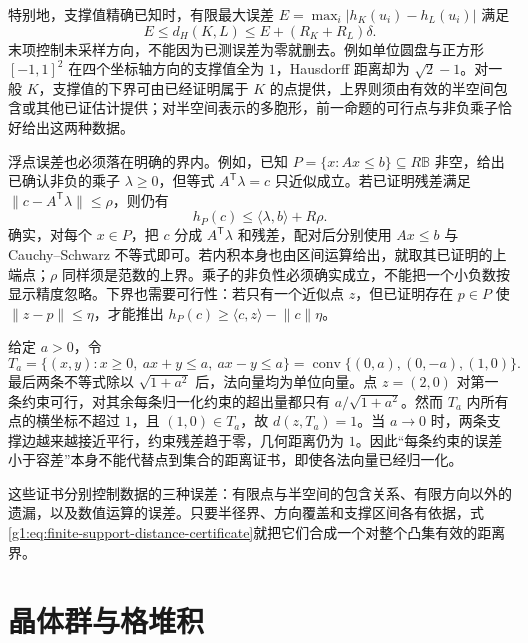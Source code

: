 特别地，支撑值精确已知时，有限最大误差 \(E=\max_i|h_K(u_i)-h_L(u_i)|\) 满足
\[
	E\le d_H(K,L)\le E+(R_K+R_L)\delta.
\]
末项控制未采样方向，不能因为已测误差为零就删去。例如单位圆盘与正方形 \([-1,1]^2\) 在四个坐标轴方向的支撑值全为 \(1\)，Hausdorff 距离却为 \(\sqrt2-1\)。对一般 \(K\)，支撑值的下界可由已经证明属于 \(K\) 的点提供，上界则须由有效的半空间包含或其他已证估计提供；对半空间表示的多胞形，前一命题的可行点与非负乘子恰好给出这两种数据。

\ProseParagraphBreak

浮点误差也必须落在明确的界内。例如，已知 \(P=\{x:Ax\le b\}\subseteq R\mathbb B\) 非空，给出已确认非负的乘子 \(\lambda\ge0\)，但等式 \(A^{\mathsf T}\lambda=c\) 只近似成立。若已证明残差满足 \(\lVert c-A^{\mathsf T}\lambda\rVert\le\rho\)，则仍有
\begin{equation}\label{g1:eq:dual-residual-support-bound}
	h_P(c)\le\langle\lambda,b\rangle+R\rho.
\end{equation}
确实，对每个 \(x\in P\)，把 \(c\) 分成 \(A^{\mathsf T}\lambda\) 和残差，配对后分别使用 \(Ax\le b\) 与 Cauchy--Schwarz 不等式即可。若内积本身也由区间运算给出，就取其已证明的上端点；\(\rho\) 同样须是范数的上界。乘子的非负性必须确实成立，不能把一个小负数按显示精度忽略。下界也需要可行性：若只有一个近似点 \(z\)，但已证明存在 \(p\in P\) 使 \(\lVert z-p\rVert\le\eta\)，才能推出 \(h_P(c)\ge\langle c,z\rangle-\lVert c\rVert\eta\)。

\begin{example}\label{g1:exm:small-residual-large-distance}
	给定 \(a>0\)，令
	\[
		T_a=\{(x,y):x\ge0,\ ax+y\le a,\ ax-y\le a\}
		=\operatorname{conv}\{(0,a),(0,-a),(1,0)\}.
	\]
	最后两条不等式除以 \(\sqrt{1+a^2}\) 后，法向量均为单位向量。点 \(z=(2,0)\) 对第一条约束可行，对其余每条归一化约束的超出量都只有 \(a/\sqrt{1+a^2}\)。然而 \(T_a\) 内所有点的横坐标不超过 \(1\)，且 \((1,0)\in T_a\)，故 \(d(z,T_a)=1\)。当 \(a\to0\) 时，两条支撑边越来越接近平行，约束残差趋于零，几何距离仍为 \(1\)。因此“每条约束的误差小于容差”本身不能代替点到集合的距离证书，即使各法向量已经归一化。
\end{example}

这些证书分别控制数据的三种误差：有限点与半空间的包含关系、有限方向以外的遗漏，以及数值运算的误差。只要半径界、方向覆盖和支撑区间各有依据，式\eqref{g1:eq:finite-support-distance-certificate}就把它们合成一个对整个凸集有效的距离界。

\section{晶体群与格堆积}
\label{g1:sec:B04}

